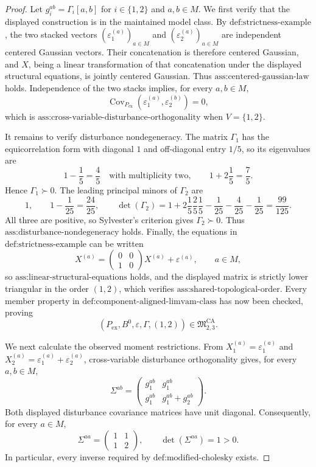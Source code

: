 \documentclass{article}
\begin{document}
\begin{proof}
Let \(g_i^{ab}=\Gamma_i[a,b]\) for \(i\in\{1,2\}\) and \(a,b\in M\).  We first verify that the displayed construction is in the maintained model class.  By \(\text{def:strictness-example}\), the two stacked vectors \((\varepsilon_1^{(a)})_{a\in M}\) and \((\varepsilon_2^{(a)})_{a\in M}\) are independent centered Gaussian vectors.  Their concatenation is therefore centered Gaussian, and \(X\), being a linear transformation of that concatenation under the displayed structural equations, is jointly centered Gaussian.  Thus \(\text{ass:centered-gaussian-law}\) holds.  Independence of the two stacks implies, for every \(a,b\in M\),
\[
\operatorname{Cov}_{P_{\mathrm{ex}}}(\varepsilon_1^{(a)},\varepsilon_2^{(b)})=0,
\]
which is \(\text{ass:cross-variable-disturbance-orthogonality}\) when \(V=\{1,2\}\).

It remains to verify disturbance nondegeneracy.  The matrix \(\Gamma_1\) has the equicorrelation form with diagonal \(1\) and off-diagonal entry \(1/5\), so its eigenvalues are
\[
1-\frac15=\frac45\quad\text{with multiplicity two},
\qquad
1+2\frac15=\frac75.
\]
Hence \(\Gamma_1\succ0\).  The leading principal minors of \(\Gamma_2\) are
\[
1,
\qquad
1-\frac1{25}=\frac{24}{25},
\qquad
\det(\Gamma_2)
=1+2\frac15\frac25\frac15-\frac1{25}-\frac4{25}-\frac1{25}
=\frac{99}{125}.
\]
All three are positive, so Sylvester's criterion gives \(\Gamma_2\succ0\).  Thus \(\text{ass:disturbance-nondegeneracy}\) holds.  Finally, the equations in \(\text{def:strictness-example}\) can be written
\[
X^{(a)}=
\begin{pmatrix}0&0\\1&0\end{pmatrix}X^{(a)}+\varepsilon^{(a)},
\qquad a\in M,
\]
so \(\text{ass:linear-structural-equations}\) holds, and the displayed matrix is strictly lower triangular in the order \((1,2)\), which verifies \(\text{ass:shared-topological-order}\).  Every member property in \(\text{def:component-aligned-limvam-class}\) has now been checked, proving
\[
(P_{\mathrm{ex}},B^0,\varepsilon,\Gamma,(1,2))\in\mathfrak M_{2,3}^{\mathrm{CA}}.
\]

We next calculate the observed moment restrictions.  From
\(X_1^{(a)}=\varepsilon_1^{(a)}\) and
\(X_2^{(a)}=\varepsilon_1^{(a)}+\varepsilon_2^{(a)}\), cross-variable disturbance orthogonality gives, for every \(a,b\in M\),
\[
\Sigma^{ab}
=\begin{pmatrix}
g_1^{ab}&g_1^{ab}\\
g_1^{ab}&g_1^{ab}+g_2^{ab}
\end{pmatrix}.
\]
Both displayed disturbance covariance matrices have unit diagonal.  Consequently, for every \(a\in M\),
\[
\Sigma^{aa}=\begin{pmatrix}1&1\\1&2\end{pmatrix},
\qquad \det(\Sigma^{aa})=1>0.
\]
In particular, every inverse required by \(\text{def:modified-cholesky}\) exists.


\end{proof}
\end{document}
